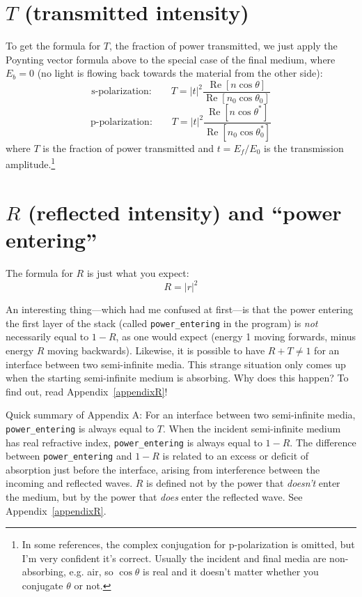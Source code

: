 \documentclass[12pt]{article}
\renewcommand{\(}{\left(}
\renewcommand{\)}{\right)}
\renewcommand{\Re}{\operatorname{Re}}
\begin{document}
\section{$T$ (transmitted intensity)}

To get the formula for $T$, the fraction of power transmitted, we just apply the Poynting vector formula above to the special case of the final medium, where $E_b=0$ (no light is flowing back towards the material from the other side):
$$\text{s-polarization:} \qquad T = |t|^2\frac{ \Re\left[ n \cos \theta\right]}{\Re \left[ n_0 \cos \theta_0 \right] }$$
$$\text{p-polarization:} \qquad T = |t|^2\frac{ \Re\left[ n \cos \theta^* \right]}{\Re \left[ n_0 \cos \theta_0^* \right] }$$
where $T$ is the fraction of power transmitted and $t=E_f/E_0$ is the transmission amplitude.\footnote{In some references, the complex conjugation for p-polarization is omitted, but I'm very confident it's correct. Usually the incident and final media are non-absorbing, e.g. air, so $\cos \theta$ is real and it doesn't matter whether you conjugate $\theta$ or not.}

\section{$R$ (reflected intensity) and ``power entering''}

The formula for $R$ is just what you expect:
$$R=|r|^2$$

An interesting thing---which had me confused at first---is that the power entering the first layer of the stack (called \verb=power_entering= in the program) is \emph{not} necessarily equal to $1-R$, as one would expect (energy 1 moving forwards, minus energy $R$ moving backwards). Likewise, it is possible to have $R+T\neq 1$ for an interface between two semi-infinite media. This strange situation only comes up when the starting semi-infinite medium is absorbing. Why does this happen? To find out, read Appendix~\ref{appendixR}!

Quick summary of Appendix A: For an interface between two semi-infinite media, \verb=power_entering= is always equal to $T$. When the incident semi-infinite medium has real refractive index, \verb=power_entering= is always equal to $1-R$. The difference between \verb=power_entering= and $1-R$ is related to an excess or deficit of absorption just before the interface, arising from interference between the incoming and reflected waves. $R$ is defined not by the power that \emph{doesn't} enter the medium, but by the power that \emph{does} enter the reflected wave. See Appendix~\ref{appendixR}.
\end{document}
